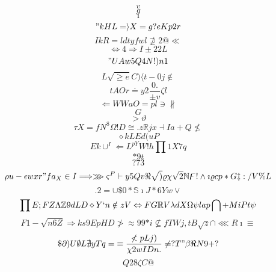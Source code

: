 \documentclass[12pt]{article}
\begin{document}
        \begin{minipage}[t][0pt]{\linewidth}

        \[v\]
\[g\]
\[\imath\]
\["kHL=\rangle X = g ? e K p 2 r\]
\[IkR=ldtyfwl\nsupseteq 2 @\ll\]
\[\iff 4\Rightarrow I\pm 2 2 L\]
\["UAw5Q4N!)n1\]
\[L\sqrt{\geq e} C )\langle t - 0 j\notin\]
\[tAOr\doteq y 2\frac{0.}{\pm v}\zeta l\]
\[\Longleftarrow W W a O = p l\ni {\nparallel}\]
\[G\]
\[>\vartheta\]
\[\tau X = f N^{8}\Omega ! {D}\cong . z\mathbb{R} j x\dashv I a + Q\nleq\]
\[\diamond k L E d ( u P\]
\[Ek\cup^{I}\Leftarrow L^{pY}W!h\prod 1 X 7 q\]
\[*9t\]
\[?73\]
\[\rho u -\epsilon w x r " f a_{X}\in I\Longrightarrow\ggg\varsigma^{P}\vdash y 5 Q v\Re\sqrt{)}\varrho\chi\sqrt{2}\mathbb{N}\digamma !\land\imath\varrho c p * G\ddagger : / V\% L\]
\[.2=\cup\$ 0 *\mathbb{S}\imath J * 6 Y w\lor\]
\[\prod E ; F Z\Lambda\mathbb{Z} 9 d L D\diamond Y ` n\notin z V\Leftrightarrow F G\mathbb{R} V\lambda d X\Omega\psi {lap}\bigcap + M i P t\psi\]
\[F1-\sqrt{n6Z}\Longrightarrow k s 9 E p H D\ngtr\approx 9 9 {*i}\nsubseteq f T W j , t B\sqrt{z}\cap\lll R\imath\equiv\]
\[\$\partial ) U\emptyset L\nexists {yTq=}\equiv\frac{\nless p L j )}{\chi 2 w I D n .}\neq ? T "\beta\Re N 9 + ?\]
\[Q28\zeta C @
        \]
\end{minipage}
\end{document}
